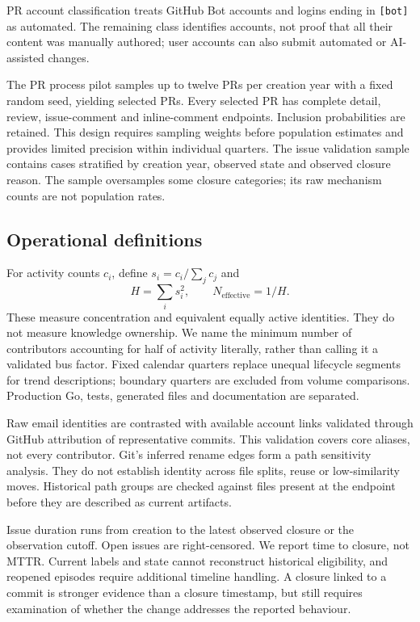 \documentclass[11pt]{article}
\begin{document}
PR account classification treats GitHub Bot accounts and logins ending in
\texttt{[bot]} as automated. The remaining class identifies accounts, not
proof that all their content was manually authored; user accounts can also
submit automated or AI-assisted changes.

The PR process pilot samples up to twelve PRs per creation year with a fixed
random seed, yielding \PilotPRCount{} selected PRs. Every selected PR has
complete detail, review, issue-comment and inline-comment endpoints. Inclusion
probabilities are retained. This design requires sampling weights before
population estimates and provides limited precision within individual quarters.
The issue validation sample contains \EvidenceIssueCount{} cases stratified by
creation year, observed state and observed closure reason. The sample oversamples
some closure categories; its raw mechanism counts are not population rates.

\subsection{Operational definitions}
For activity counts $c_i$, define $s_i=c_i/\sum_j c_j$ and
\[
H=\sum_i s_i^2,\qquad N_{\mathrm{effective}}=1/H.
\]
These measure concentration and equivalent equally active identities. They do
not measure knowledge ownership. We name the minimum number of contributors
accounting for half of activity literally, rather than calling it a validated
bus factor. Fixed calendar quarters replace unequal lifecycle segments for
trend descriptions; boundary quarters are excluded from volume comparisons.
Production Go, tests, generated files and documentation are separated.

Raw email identities are contrasted with available account links validated
through GitHub attribution of representative commits. This validation covers
core aliases, not every contributor. Git's inferred rename edges form a path
sensitivity analysis. They do not establish identity across file splits, reuse
or low-similarity moves. Historical path groups are checked against files present
at the endpoint before they are described as current artifacts.

Issue duration runs from creation to the latest observed closure or the observation
cutoff. Open issues are right-censored. We report time to closure, not MTTR.
Current labels and state cannot reconstruct historical eligibility, and reopened
episodes require additional timeline handling. A closure linked to a commit
is stronger evidence than a closure timestamp, but still requires examination
of whether the change addresses the reported behaviour.
\end{document}

